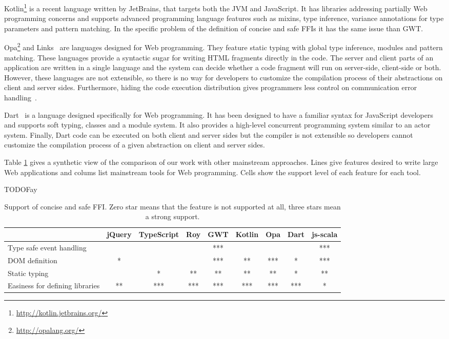 \documentclass[runningheads,a4paper]{llncs}
\begin{document}
Kotlin\footnote{\href{http://kotlin.jetbrains.org/}{http://kotlin.jetbrains.org/}} is a recent language written by
JetBrains, that targets both the JVM and JavaScript. It has libraries addressing partially Web programming concerns
and supports advanced programming language features such as mixins, type inference, variance annotations for type
parameters and pattern matching. In the specific problem of the definition of concise and safe FFIs it has the same issue than GWT. 

Opa\footnote{\href{http://opalang.org/}{http://opalang.org/}} and Links~\cite{Cooper07_Links} are languages designed
for Web programming. They feature static typing with global type inference, modules and pattern matching. These
languages provide a syntactic sugar for writing HTML fragments directly in the code. The server and client parts of
an application are written in a single language and the system can decide whether a code fragment will run on
server-side, client-side or both. However, these languages are not extensible, so there is no way for developers to
customize the compilation process of their abstractions on client and server sides. Furthermore, hiding the code
execution distribution gives programmers less control on communication error handling~\cite{Guerraoui99_Distributed}.

Dart~\cite{Griffith11_Dart} is a language designed specifically for Web programming. It has been designed to have a
familiar syntax for JavaScript developers and supports soft typing, classes and a module system. It also provides a
high-level concurrent programming system similar to an actor system. Finally, Dart code can be executed on both
client and server sides but the compiler is not extensible so developers cannot customize the compilation process of
a given abstraction on client and server sides.

Table \ref{comparison} gives a synthetic view of the comparison of our work with other mainstream approaches. Lines
give features desired to write large Web applications and colums list mainstream tools for Web programming. Cells
show the support level of each feature for each tool.

TODO{Fay}

\begin{table}
\centering
\begin{tabular}{| l | c | c | c | c | c | c | c | c |}
\hline
& jQuery & TypeScript & Roy & GWT & Kotlin & Opa & Dart & js-scala \\
\hline
Type safe event handling & & & & *** & & & & *** \\
\hline
DOM definition & * & & & *** & ** & *** & * & *** \\
\hline
Static typing & & * & ** & ** & ** & ** & * & ** \\
\hline
Easiness for defining libraries & ** & *** & *** & *** & *** & *** & *** & * \\
\hline
\end{tabular}
\caption{Support of concise and safe FFI. Zero star means that the feature is not supported
at all, three stars mean a strong support.}
\label{comparison}
\end{table}
\end{document}
